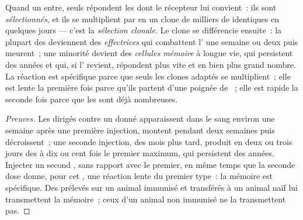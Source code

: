 \begin{proposition}\label{prop:g12:adaptive-immunity:selection}
Quand un  entre, seuls répondent les  dont le
récepteur lui convient~: ils sont \emph{sélectionnés}, et ils se
multiplient par  en un clone de milliers de  identiques
en quelques jours --- c'est la \emph{sélection
clonale}. Le clone se différencie ensuite~:
la plupart des  deviennent des \emph{ effectrices} qui
combattent l' une semaine ou deux puis meurent~; une minorité
devient des \emph{cellules mémoire} à longue
vie, qui persistent des années et qui, si l' revient,
répondent plus vite et en bien plus grand nombre. La réaction est
spécifique parce que seuls les clones adaptés se multiplient~; elle
est lente la première fois parce qu'ils partent d'une poignée de
~; elle est rapide la seconde fois parce que les  sont déjà nombreuses.
\end{proposition}
\begin{proof}[Preuves]
Les  dirigés contre un  donné apparaissent dans le
sang environ une semaine après une première injection, montent pendant
deux semaines puis décroissent~; une seconde injection, des mois plus
tard, produit en deux ou trois jours des  à dix ou cent fois
le premier maximum, qui persistent des années. Injecter un second
, sans rapport avec le premier, en même temps que la seconde
dose donne, pour cet , une réaction lente du premier type~: la
mémoire est spécifique. Des  prélevés sur un animal
immunisé et transférés à un animal naïf lui transmettent la mémoire~;
ceux d'un animal non immunisé ne la transmettent pas.
\end{proof}

